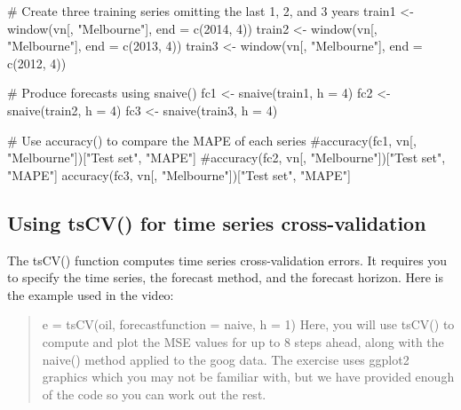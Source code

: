 \documentclass[
  letterpaper,
  DIV=11,
  numbers=noendperiod]{scrartcl}
\newenvironment{Shaded}{\begin{snugshade}}{\end{snugshade}}
\newcommand{\AttributeTok}[1]{\textcolor[rgb]{0.40,0.45,0.13}{#1}}
\newcommand{\CommentTok}[1]{\textcolor[rgb]{0.37,0.37,0.37}{#1}}
\newcommand{\DecValTok}[1]{\textcolor[rgb]{0.68,0.00,0.00}{#1}}
\newcommand{\FunctionTok}[1]{\textcolor[rgb]{0.28,0.35,0.67}{#1}}
\newcommand{\NormalTok}[1]{\textcolor[rgb]{0.00,0.23,0.31}{#1}}
\newcommand{\OtherTok}[1]{\textcolor[rgb]{0.00,0.23,0.31}{#1}}
\newcommand{\StringTok}[1]{\textcolor[rgb]{0.13,0.47,0.30}{#1}}
\begin{document}
\begin{Shaded}
\begin{Highlighting}[]
\CommentTok{\# Create three training series omitting the last 1, 2, and 3 years}
\NormalTok{train1 }\OtherTok{\textless{}{-}} \FunctionTok{window}\NormalTok{(vn[, }\StringTok{"Melbourne"}\NormalTok{], }\AttributeTok{end =} \FunctionTok{c}\NormalTok{(}\DecValTok{2014}\NormalTok{, }\DecValTok{4}\NormalTok{))}
\NormalTok{train2 }\OtherTok{\textless{}{-}} \FunctionTok{window}\NormalTok{(vn[, }\StringTok{"Melbourne"}\NormalTok{], }\AttributeTok{end =} \FunctionTok{c}\NormalTok{(}\DecValTok{2013}\NormalTok{, }\DecValTok{4}\NormalTok{))}
\NormalTok{train3 }\OtherTok{\textless{}{-}} \FunctionTok{window}\NormalTok{(vn[, }\StringTok{"Melbourne"}\NormalTok{], }\AttributeTok{end =} \FunctionTok{c}\NormalTok{(}\DecValTok{2012}\NormalTok{, }\DecValTok{4}\NormalTok{))}

\CommentTok{\# Produce forecasts using snaive()}
\NormalTok{fc1 }\OtherTok{\textless{}{-}} \FunctionTok{snaive}\NormalTok{(train1, }\AttributeTok{h =} \DecValTok{4}\NormalTok{)}
\NormalTok{fc2 }\OtherTok{\textless{}{-}} \FunctionTok{snaive}\NormalTok{(train2, }\AttributeTok{h =} \DecValTok{4}\NormalTok{)}
\NormalTok{fc3 }\OtherTok{\textless{}{-}} \FunctionTok{snaive}\NormalTok{(train3, }\AttributeTok{h =} \DecValTok{4}\NormalTok{)}

\CommentTok{\# Use accuracy() to compare the MAPE of each series}
\CommentTok{\#accuracy(fc1, vn[, "Melbourne"])["Test set", "MAPE"]}
\CommentTok{\#accuracy(fc2, vn[, "Melbourne"])["Test set", "MAPE"]}
\FunctionTok{accuracy}\NormalTok{(fc3, vn[, }\StringTok{"Melbourne"}\NormalTok{])[}\StringTok{"Test set"}\NormalTok{, }\StringTok{"MAPE"}\NormalTok{]}
\end{Highlighting}
\end{Shaded}

\hypertarget{using-tscv-for-time-series-cross-validation}{%
\subsection{Using tsCV() for time series
cross-validation}\label{using-tscv-for-time-series-cross-validation}}

The tsCV() function computes time series cross-validation errors. It
requires you to specify the time series, the forecast method, and the
forecast horizon. Here is the example used in the video:

\begin{quote}
e = tsCV(oil, forecastfunction = naive, h = 1) Here, you will use tsCV()
to compute and plot the MSE values for up to 8 steps ahead, along with
the naive() method applied to the goog data. The exercise uses ggplot2
graphics which you may not be familiar with, but we have provided enough
of the code so you can work out the rest.
\end{quote}
\end{document}
